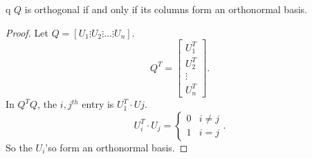   \begin{proposition}
    q $Q$ is orthogonal if and only if its columns form an orthonormal basis.
    \begin{proof}
      Let $Q=[U_1\vdots U_2 \vdots\ldots\vdots U_n]$.
      \[
      Q^{T}=\begin{bmatrix} U_1^{T}\\U_2^{T}\\ \vdots \\ U_n^{T} \end{bmatrix} 
      .\] 
      In $Q^{T}Q$, the $i,j^{th}$ entry is $U_1^{T}\cdot Uj$.
      \[
      U_i^{T}\cdot U_j =
      \begin{cases}
        0&i\neq j\\
        1&i=j
      \end{cases}
      .\] 
      So the $U_i$'so form an orthonormal basis.
    \end{proof}
  \end{proposition}
